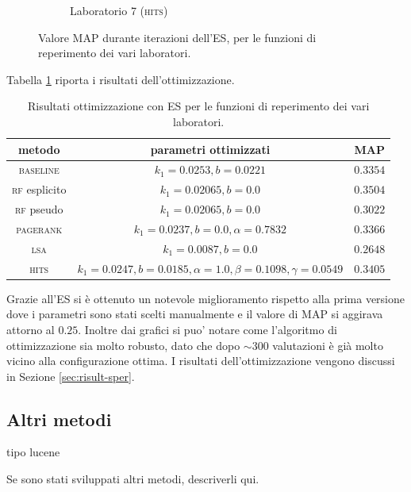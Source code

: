 \begin{figure}
\begin{subfigure}[htpb]{0.475\textwidth}
            \caption[]%
            {{\small Laboratorio 7 (\textsc{hits})}}    
            \label{fig:es_lab7}
        \end{subfigure}
        \caption[ The average and standard deviation of critical parameters ]
        {\small Valore MAP durante iterazioni dell'ES, per le funzioni di reperimento dei vari laboratori.} 
        \label{fig:es_all}
\end{figure}
Tabella \ref{tab:es} riporta i risultati dell'ottimizzazione.
\begin{table}[htpb]

\begin{center}
\begin{tabular}{|c|c|c|}
\hline
metodo & parametri ottimizzati & MAP \\
 \hline
\textsc{baseline} & $k_1 = 0.0253, b = 0.0221$ & $0.3354$ \\
\textsc{rf} esplicito & $k_1 = 0.02065, b = 0.0$ & $0.3504$ \\
\textsc{rf} pseudo & $k_1 = 0.02065, b = 0.0$ & $0.3022$ \\
\textsc{pagerank} & $k_1 = 0.0237, b = 0.0, \alpha=0.7832$ & $0.3366$ \\
\textsc{lsa} & $k_1 = 0.0087, b = 0.0$ & $0.2648$ \\
\textsc{hits} & $k_1 = 0.0247, b = 0.0185, \alpha=1.0, \beta=0.1098, \gamma=0.0549$ & $0.3405$ \\
\hline
\end{tabular}
\end{center}
\caption{Risultati ottimizzazione con ES per le funzioni di reperimento dei vari laboratori.}
\label{tab:es}
\end{table}

Grazie all'ES si \`e ottenuto un notevole miglioramento rispetto alla prima versione dove i parametri sono stati scelti manualmente e il valore di MAP si aggirava attorno al $0.25$. Inoltre dai grafici si puo' notare come l'algoritmo di ottimizzazione sia molto robusto, dato che dopo $\sim{300}$ valutazioni \`e gi\`a molto vicino alla configurazione ottima. I risultati dell'ottimizzazione vengono discussi in Sezione \ref{sec:risult-sper}.

\subsection{Altri metodi}
tipo lucene
\label{sec:altri-metodi}

Se sono stati sviluppati altri metodi, descriverli qui.

